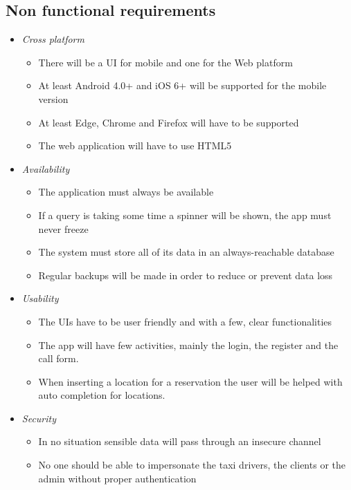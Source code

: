 \documentclass{article}
\begin{document}
\subsection{Non functional requirements}
\begin{itemize}
	\item \textit{Cross platform} %
		\begin{itemize}
			\item There will be a UI for mobile and one for the Web platform 
			\item At least Android 4.0+ and iOS 6+ will be supported for the mobile version 
			\item At least Edge, Chrome and Firefox will have to be supported
			\item The web application will have to use HTML5 %
		\end{itemize}
	\item \textit{Availability}
		\begin{itemize}
			\item The application must always be available
			\item If a query is taking some time a spinner will be shown, the app must never freeze %
			\item The system must store all of its data in an always-reachable database
			\item Regular backups will be made in order to reduce or prevent data loss
		\end{itemize}
	\item \textit{Usability} %
		\begin{itemize}
			\item The UIs have to be user friendly and with a few, clear functionalities
			\item The app will have few activities, mainly the login, the register and the call form.
			\item When inserting a location for a reservation the user will be helped with auto completion for locations.
		\end{itemize}
	\item \textit{Security}
		\begin{itemize}
			\item In no situation sensible data will pass through an insecure channel
			\item No one should be able to impersonate the taxi drivers, the clients or the admin without proper authentication %
		\end{itemize}
\end{itemize}
\end{document}
